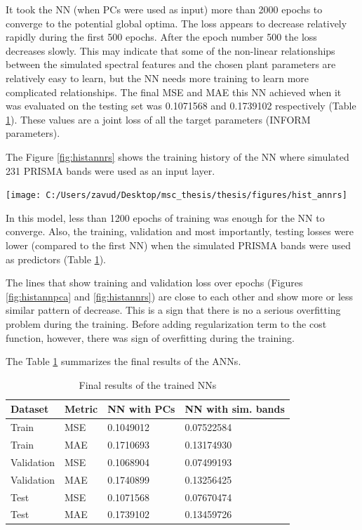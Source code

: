 \documentclass[a4paper, twoside]{templates/ociamthesis}
\let\origfigure\figure
\let\endorigfigure\endfigure
\renewenvironment{figure}[1][2] {
    \expandafter\origfigure\expandafter[H]
} {
    \endorigfigure
}
\begin{document}
It took the NN (when PCs were used as input) more than 2000 epochs to converge to the potential global optima. The loss appears to decrease relatively rapidly during the first 500 epochs. After the epoch number 500 the loss decreases slowly. This may indicate that some of the non-linear relationships between the simulated spectral features and the chosen plant parameters are relatively easy to learn, but the NN needs more training to learn more complicated relationships. The final MSE and MAE this NN achieved when it was evaluated on the testing set was 0.1071568 and 0.1739102 respectively (Table \ref{tab:losstable}). These values are a joint loss of all the target parameters (INFORM parameters).

The Figure \ref{fig:histannrs} shows the training history of the NN where simulated 231 PRISMA bands were used as an input layer.

\begin{figure}
\texttt{[image: C:/Users/zavud/Desktop/msc\_thesis/thesis/figures/hist\_annrs]} \caption{Training history of ANN with simulated PRISMA bands}\label{fig:histannrs}
\end{figure}

In this model, less than 1200 epochs of training was enough for the NN to converge. Also, the training, validation and most importantly, testing losses were lower (compared to the first NN) when the simulated PRISMA bands were used as predictors (Table \ref{tab:losstable}).

The lines that show training and validation loss over epochs (Figures \ref{fig:histannpca} and \ref{fig:histannrs}) are close to each other and show more or less similar pattern of decrease. This is a sign that there is no a serious overfitting problem during the training. Before adding regularization term to the cost function, however, there was sign of overfitting during the training.

\newpage

The Table \ref{tab:losstable} summarizes the final results of the ANNs.

\begin{table}[H]

\caption{\label{tab:losstable}Final results of the trained NNs}
\centering
\begin{tabular}[t]{llll}
\toprule
Dataset & Metric & NN with PCs & NN with sim. bands\\
\midrule
Train & MSE & 0.1049012 & 0.07522584\\
Train & MAE & 0.1710693 & 0.13174930\\
Validation & MSE & 0.1068904 & 0.07499193\\
Validation & MAE & 0.1740899 & 0.13256425\\
Test & MSE & 0.1071568 & 0.07670474\\
\addlinespace
Test & MAE & 0.1739102 & 0.13459726\\
\bottomrule
\end{tabular}
\end{table}
\end{document}
